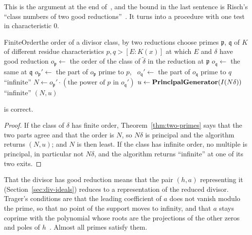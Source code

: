 This is the argument at the end of~\cite[\S6.2]{trager1984}, and the bound
in the last sentence is Risch's ``class numbers of two good
reductions''~\cite{risch1970}. It turns  into a
procedure with one test in characteristic $0$.

\begin{algo}{FiniteOrder}{\delta}{the order of a divisor class, by two reductions}
\State choose primes $\mathfrak p$, $\mathfrak q$ of $K$ of different residue characteristics $p, q > [E : K(x)]$ at which $E$ and $\delta$ have good reduction
\State $o_{\mathfrak p} \gets$ the order of the class of $\tilde\delta$ in the reduction at $\mathfrak p$ 
\State $o_{\mathfrak q} \gets$ the same at $\mathfrak q$
\State $o_{\mathfrak p}' \gets$ the part of $o_{\mathfrak p}$ prime to $p$, \ $o_{\mathfrak q}' \gets$ the part of $o_{\mathfrak q}$ prime to $q$
 \Return ``infinite'' \EndIf
\State $N \gets o_{\mathfrak p}' \cdot (\text{the power of } p \text{ in } o_{\mathfrak q}')$
\State $u \gets \textbf{PrincipalGenerator}(I(N\delta))$
 \Return ``infinite'' \EndIf
\State \Return $(N, u)$
\end{algo}

\begin{theorem}\label{thm:finite-order}
 is correct.
\end{theorem}

\begin{proof}
If the class of $\delta$ has finite order, Theorem~\ref{thm:two-primes} says
that the two parts agree and that the order is $N$, so $N\delta$ is principal
and the algorithm returns $(N, u)$; and $N$ is then least. If the class has
infinite order, no multiple is principal, in particular not $N\delta$, and
the algorithm returns ``infinite'' at one of its two exits.
\end{proof}

That the divisor has good reduction means that the pair $(h, a)$
representing it (Section~\ref{sec:div-ideals}) reduces to a representation of
the reduced divisor. Trager's conditions are that the leading coefficient of
$a$ does not vanish modulo the prime, so that no point of the support moves
to infinity, and that $a$ stays coprime with the polynomial whose roots are
the projections of the other zeros and poles of
$h$~\cite[\S6.3]{trager1984}. Almost all primes satisfy them.

